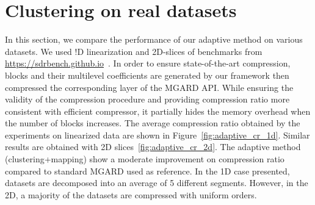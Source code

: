 \documentclass[conference]{IEEEtran}
\theoremstyle{remark}
\begin{document}
\section{Clustering on real datasets}
\label{sec:exp}

In this section, we compare the performance of our adaptive method on various datasets. 
We used !D linearization and 2D-slices of benchmarks from \url{https://sdrbench.github.io}~\cite{zhao2020sdrbench}.
In order to ensure state-of-the-art compression, blocks and their multilevel coefficients are generated by our framework then compressed the corresponding layer of the MGARD API.
While ensuring the validity of the compression procedure and providing compression ratio more consistent with efficient compressor, it partially hides the memory overhead when the number of blocks increases.
The average compression ratio obtained by the experiments on linearized data are shown in Figure~\ref{fig:adaptive_cr_1d}. Similar results are obtained with 2D slices~\ref{fig:adaptive_cr_2d}. 
The adaptive method (clustering+mapping) show a moderate improvement on compression ratio compared to standard MGARD used as reference.
In the 1D case presented, datasets are decomposed into an average of 5 different segments. However, in the 2D, a majority of the datasets are compressed with uniform orders.

\end{document}
